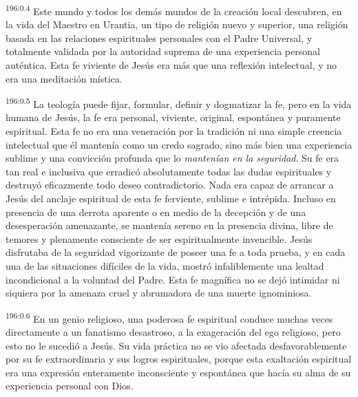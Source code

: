 \par 
\textsuperscript{196:0.4} Este mundo y todos los demás mundos de la creación local descubren, en la vida del Maestro en Urantia, un tipo de religión nuevo y superior, una religión basada en las relaciones espirituales personales con el Padre Universal, y totalmente validada por la autoridad suprema de una experiencia personal auténtica. Esta fe viviente de Jesús era más que una reflexión intelectual, y no era una meditación mística.

\par 
\textsuperscript{196:0.5} La teología puede fijar, formular, definir y dogmatizar la fe, pero en la vida humana de Jesús, la fe era personal, viviente, original, espontánea y puramente espiritual. Esta fe no era una veneración por la tradición ni una simple creencia intelectual que él mantenía como un credo sagrado, sino más bien una experiencia sublime y una convicción profunda que lo \textit{mantenían en la seguridad}. Su fe era tan real e inclusiva que erradicó absolutamente todas las dudas espirituales y destruyó eficazmente todo deseo contradictorio. Nada era capaz de arrancar a Jesús del anclaje espiritual de esta fe ferviente, sublime e intrépida. Incluso en presencia de una derrota aparente o en medio de la decepción y de una desesperación amenazante, se mantenía sereno en la presencia divina, libre de temores y plenamente consciente de ser espiritualmente invencible. Jesús disfrutaba de la seguridad vigorizante de poseer una fe a toda prueba, y en cada una de las situaciones difíciles de la vida, mostró infaliblemente una lealtad incondicional a la voluntad del Padre. Esta fe magnífica no se dejó intimidar ni siquiera por la amenaza cruel y abrumadora de una muerte ignominiosa.

\par 
\textsuperscript{196:0.6} En un genio religioso, una poderosa fe espiritual conduce muchas veces directamente a un fanatismo desastroso, a la exageración del ego religioso, pero esto no le sucedió a Jesús. Su vida práctica no se vio afectada desfavorablemente por su fe extraordinaria y sus logros espirituales, porque esta exaltación espiritual era una expresión enteramente inconsciente y espontánea que hacía su alma de su experiencia personal con Dios.


